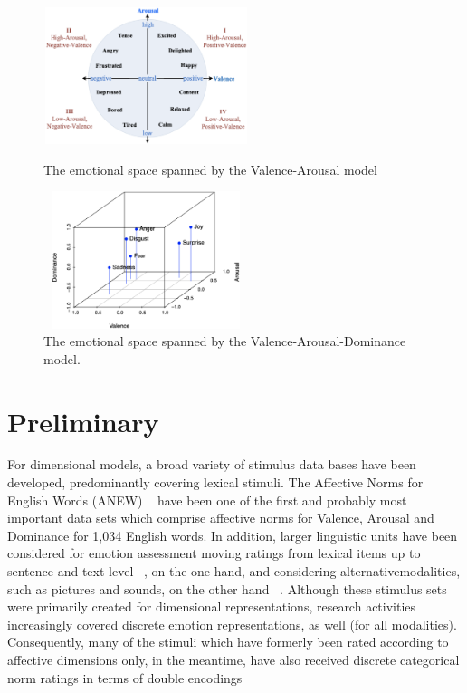 \begin{figure}[htbp]
	\begin{minipage}[t]{0.5\linewidth}
		\centering
		\includegraphics[height=4cm,width=6cm]{figures/va_emotion.eps}
		\caption{The emotional space spanned by the Valence-Arousal model}\label{fig:va}
	\end{minipage}%
	\hfill
	\begin{minipage}[t]{0.5\linewidth}
		\centering
		\includegraphics[height=4cm,width=6cm]{figures/six_emotions_vad.eps}
		\caption{The emotional space spanned by the Valence-Arousal-Dominance model. }\label{fig:vad}
	\end{minipage}
\end{figure}


\section{Preliminary}

For dimensional models, 
a broad variety of stimulus data
bases have been developed, 
predominantly covering lexical stimuli. 
The Affective Norms for English Words (ANEW)
~\cite{Bradley1999}
have been one of the first and
probably most important data sets 
which comprise affective
norms for Valence, Arousal and Dominance
for 1,034 English words. 
In addition, 
larger linguistic units have been considered for 
emotion assessment moving ratings 
from lexical items up to sentence
and text level 
~\cite{Pinheiro2016,}, 
on the one hand, 
and considering alternativemodalities, 
such as pictures and sounds, 
on the other hand 
~\cite{Lang2008,Lang1999}. 
Although these stimulus sets were primarily created
for dimensional representations, 
research activities increasingly
covered discrete emotion representations, 
as well (for all modalities). 
Consequently, 
many of the stimuli which
have formerly been rated according to 
affective dimensions only, 
in the meantime, 
have also received discrete categorical
norm ratings in terms of 
double encodings 
~\cite{Stevenson2008,Stevenson2007}

